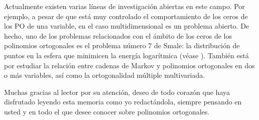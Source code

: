 Actualmente existen varias líneas de investigación abiertas en este campo. Por ejemplo, a pesar de que está muy controlado el comportamiento de los ceros de los PO de una variable, en el caso multidimensional es un problema abierto. De hecho, uno de los problemas relacionados con el ámbito de los ceros de los polinomios ortogonales es el problema número 7 de Smale: la distribución de puntos en la esfera que minimicen la energía logarítmica (véase \cite{Beltran}). También está por estudiar la relación entre cadenas de Markov y polinomios ortogonales en dos o más variables, así como la ortogonalidad múltiple multivariada.

Muchas gracias al lector por su atención, deseo de todo corazón que haya disfrutado leyendo esta memoria como yo redactándola, siempre pensando en usted y en todo el que desee conocer sobre polinomios ortogonales.


